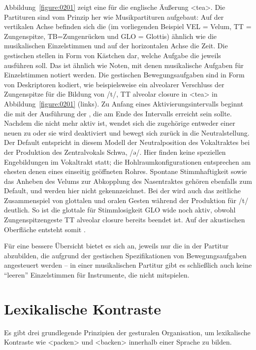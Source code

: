 Abbildung~\ref{figure:0201} zeigt eine  für die englische Äußerung <tea>. Die Partituren sind vom Prinzip her wie Musikpartituren aufgebaut: Auf der vertikalen Achse befinden sich die  (im vorliegenden Beispiel VEL = Velum, TT = Zungenspitze, TB=Zungenrücken und GLO = Glottis) ähnlich wie die musikalischen Einzelstimmen und auf der horizontalen Achse die Zeit. Die gestischen  stellen in Form von Kästchen dar, welche Aufgabe die  jeweils ausführen soll. Das ist ähnlich wie Noten, mit denen musikalische Aufgaben für Einzelstimmen notiert werden. Die gestischen Bewegungsaufgaben sind in Form von Deskriptoren kodiert, wie beispielsweise ein alveolarer Verschluss der Zungenspitze für die Bildung von /t/, {TT alveolar closure} in <tea> in Abbildung~\ref{figure:0201} (links). Zu Anfang eines Aktivierungsintervalls beginnt die  mit der Ausführung der , die am Ende des Intervalls erreicht sein sollte. Nachdem die  nicht mehr aktiv ist, wendet sich die zugehörige  entweder einer neuen  zu oder sie wird deaktiviert und bewegt sich zurück in die Neutralstellung. Der Default entspricht in diesem Modell der Neutralposition des Vokaltraktes bei der Produktion des Zentralvokals Schwa, /ə/. Hier finden keine speziellen Engebildungen im Vokaltrakt statt; die Hohlraumkonfigurationen entsprechen am ehesten denen eines einseitig geöffneten Rohres. Spontane Stimmhaftigkeit sowie das Anheben des Velums zur Abkopplung des Nasentraktes gehören ebenfalls zum Default, und werden hier nicht gekennzeichnet. Bei der  wird auch das zeitliche Zusammenspiel von glottalen und oralen Gesten während der Produktion für /t/ deutlich. So ist die glottale  für Stimmlosigkeit {GLO wide} noch aktiv, obwohl Zungenspitzengeste {TT alveolar closure} bereits beendet ist. Auf der akustischen Oberfläche entsteht somit .

Für eine bessere Übersicht bietet es sich an, jeweils nur die  in der Partitur abzubilden, die aufgrund der gestischen Spezifikationen von Bewegungsaufgaben angesteuert werden -- in einer musikalischen Partitur gibt es schließlich auch keine \enquote{leeren} Einzelstimmen für Instrumente, die nicht mitspielen. 


\section{Lexikalische Kontraste}
\label{sec:0201}
Es gibt drei grundlegende Prinzipien der gesturalen Organisation, um lexikalische Kontraste wie <packen> und <backen> innerhalb einer Sprache zu bilden. 


